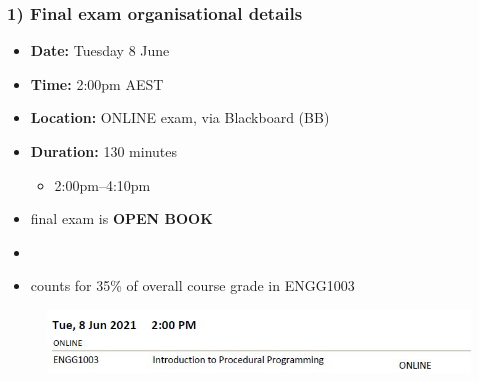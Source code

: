 \documentclass[english,14pt]{beamer}
\begin{document}
\begin{frame}[fragile]

\frametitle{1) Final exam organisational details}

\begin{itemize}
	\item \textbf{Date:} Tuesday 8 June
	\item \textbf{Time:} 2:00pm AEST
	\item \textbf{Location:} ONLINE exam, via Blackboard (BB)
	\item \textbf{Duration:} 130 minutes
	\begin{itemize}
		\item 2:00pm--4:10pm
	\end{itemize}
	\item final exam is \textbf{OPEN BOOK}
	\item[]
	\item counts for 35\% of overall course grade in ENGG1003
\end{itemize}

\begin{figure}[ht]
	\centering
	\includegraphics[width=\textwidth]{figures/finalexamdatetime}
\end{figure}

\end{frame}

\end{document}
